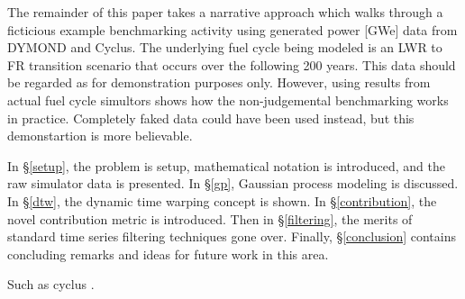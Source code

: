 The remainder of this paper takes a narrative approach which walks through 
a ficticious example benchmarking activity using generated power [GWe] data 
from DYMOND and Cyclus. The underlying fuel cycle being modeled is an
LWR to FR transition scenario that occurs over the following 200 years.  
This data should be regarded as for demonstration purposes only. However, 
using results from actual fuel cycle simultors shows how the non-judgemental
benchmarking works in practice. Completely faked data could have been used 
instead, but this demonstartion is more believable.

In \S \ref{setup}, the problem is setup, mathematical notation is introduced, 
and the raw simulator data is presented. In \S \ref{gp}, Gaussian process 
modeling is discussed. In \S \ref{dtw}, the dynamic time warping concept is
shown. In \S \ref{contribution}, the novel contribution metric is introduced.
Then in \S \ref{filtering}, the merits of standard time series filtering
techniques gone over. Finally, \S \ref{conclusion} contains concluding remarks
and ideas for future work in this area.
 
Such as cyclus \cite{cyclus_v1_2}.